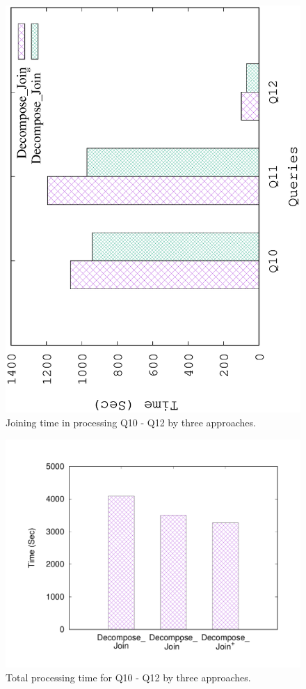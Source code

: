 \begin{figure}[H]
	\centering
	\includegraphics[scale=0.5, angle=270]{plot/threejoin}
	\caption{Joining time in processing Q10 - Q12 by three approaches.}
	\label{fig:threejoin}
\end{figure}
\begin{figure}[H]
	\centering
	\includegraphics[scale=0.5, angle=270]{plot/threetotal}
	\caption{Total processing time for Q10 - Q12 by three approaches.}
	\label{fig:threetotal}
\end{figure}

